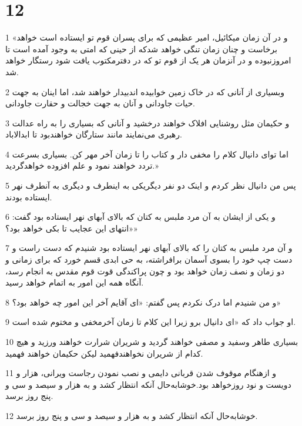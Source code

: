 \chapter{12}

\par 1 «و در آن زمان میکائیل، امیر عظیمی که برای پسران قوم تو ایستاده است خواهد برخاست و چنان زمان تنگی خواهد شدکه از حینی که امتی به وجود آمده است تا امروزنبوده و در آنزمان هر یک از قوم تو که در دفترمکتوب یافت شود رستگار خواهد شد.
\par 2 وبسیاری از آنانی که در خاک زمین خوابیده اندبیدار خواهند شد، اما اینان به جهت حیات جاودانی و آنان به جهت خجالت و حقارت جاودانی.
\par 3 و حکیمان مثل روشنایی افلاک خواهند درخشید و آنانی که بسیاری را به راه عدالت رهبری می‌نمایند مانند ستارگان خواهندبود تا ابدالاباد.
\par 4 اما تو‌ای دانیال کلام را مخفی دار و کتاب را تا زمان آخر مهر کن. بسیاری بسرعت تردد خواهند نمود و علم افزوده خواهدگردید.»
\par 5 پس من دانیال نظر کردم و اینک دو نفر دیگریکی به اینطرف و دیگری به آنطرف نهر ایستاده بودند.
\par 6 و یکی از ایشان به آن مرد ملبس به کتان که بالای آبهای نهر ایستاده بود گفت: «انتهای این عجایب تا بکی خواهد بود؟»
\par 7 و آن مرد ملبس به کتان را که بالای آبهای نهر ایستاده بود شنیدم که دست راست و دست چپ خود را بسوی آسمان برافراشته، به حی ابدی قسم خورد که برای زمانی و دو زمان و نصف زمان خواهد بود و چون پراکندگی قوت قوم مقدس به انجام رسد، آنگاه همه این امور به اتمام خواهد رسید.
\par 8 و من شنیدم اما درک نکردم پس گفتم: «ای آقایم آخر این امور چه خواهد بود؟»
\par 9 او جواب داد که «ای دانیال برو زیرا این کلام تا زمان آخرمخفی و مختوم شده است.
\par 10 بسیاری طاهر وسفید و مصفی خواهند گردید و شریران شرارت خواهند ورزید و هیچ کدام از شریران نخواهندفهمید لیکن حکیمان خواهند فهمید.
\par 11 و ازهنگام موقوف شدن قربانی دایمی و نصب نمودن رجاست ویرانی، هزار و دویست و نود روزخواهد بود.خوشابه‌حال آنکه انتظار کشد و به هزار و سیصد و سی و پنج روز برسد.
\par 12 خوشابه‌حال آنکه انتظار کشد و به هزار و سیصد و سی و پنج روز برسد.



